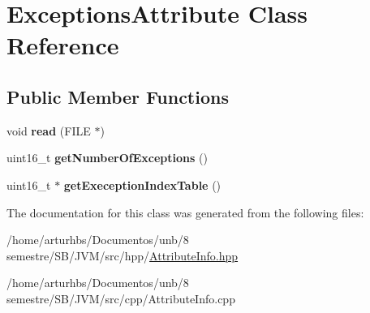\hypertarget{classExceptionsAttribute}{}\section{Exceptions\+Attribute Class Reference}
\label{classExceptionsAttribute}
\subsection*{Public Member Functions}
\begin{DoxyCompactItemize}
\item 
void {\bfseries read} (F\+I\+LE $\ast$)\hypertarget{classExceptionsAttribute_abd96393a69272508d4466fa0483c3035}{}\label{classExceptionsAttribute_abd96393a69272508d4466fa0483c3035}

\item 
uint16\+\_\+t {\bfseries get\+Number\+Of\+Exceptions} ()\hypertarget{classExceptionsAttribute_a32d7b850443b14b860a544eb7a3b5308}{}\label{classExceptionsAttribute_a32d7b850443b14b860a544eb7a3b5308}

\item 
uint16\+\_\+t $\ast$ {\bfseries get\+Exeception\+Index\+Table} ()\hypertarget{classExceptionsAttribute_a09c8f830fd0e8da6ae03ab086d28b468}{}\label{classExceptionsAttribute_a09c8f830fd0e8da6ae03ab086d28b468}

\end{DoxyCompactItemize}


The documentation for this class was generated from the following files\+:\begin{DoxyCompactItemize}
\item 
/home/arturhbs/\+Documentos/unb/8 semestre/\+S\+B/\+J\+V\+M/src/hpp/\hyperlink{AttributeInfo_8hpp}{Attribute\+Info.\+hpp}\item 
/home/arturhbs/\+Documentos/unb/8 semestre/\+S\+B/\+J\+V\+M/src/cpp/Attribute\+Info.\+cpp\end{DoxyCompactItemize}
